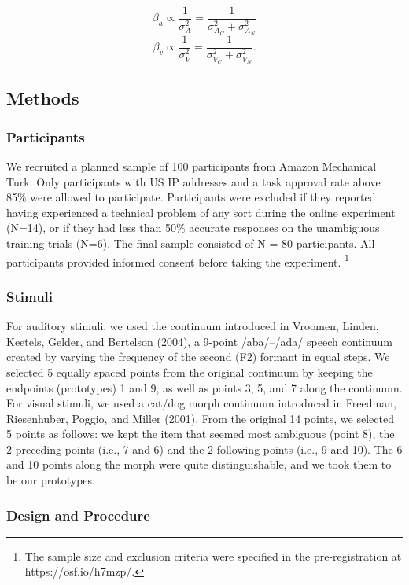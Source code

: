 \documentclass[english,,man,floatsintext]{apa6}
\let\rmarkdownfootnote\footnote%
\def\footnote{\protect\rmarkdownfootnote}
\theoremstyle{definition}
\theoremstyle{definition}
\theoremstyle{definition}
\theoremstyle{remark}
\begin{document}
\[\beta_a \propto \frac{1}{\sigma^2_{A}} = \frac{1}{\sigma^2_{A_C} + \sigma^2_{A_N}}\]
\[\beta_v \propto \frac{1}{\sigma^2_{V}} = \frac{1}{\sigma^2_{V_C} + \sigma^2_{V_N}}.\]

\subsection{Methods}\label{methods}

\subsubsection{Participants}\label{participants}

We recruited a planned sample of 100 participants from Amazon Mechanical
Turk. Only participants with US IP addresses and a task approval rate
above 85\% were allowed to participate. Participants were excluded if
they reported having experienced a technical problem of any sort during
the online experiment (N=14), or if they had less than 50\% accurate
responses on the unambiguous training trials (N=6). The final sample
consisted of N = 80 participants. All participants provided informed
consent before taking the experiment.
\footnote{The sample size and exclusion criteria were specified in the pre-registration at https://osf.io/h7mzp/.}

\subsubsection{Stimuli}\label{stimuli}

For auditory stimuli, we used the continuum introduced in Vroomen,
Linden, Keetels, Gelder, and Bertelson (2004), a 9-point /aba/--/ada/
speech continuum created by varying the frequency of the second (F2)
formant in equal steps. We selected 5 equally spaced points from the
original continuum by keeping the endpoints (prototypes) 1 and 9, as
well as points 3, 5, and 7 along the continuum. For visual stimuli, we
used a cat/dog morph continuum introduced in Freedman, Riesenhuber,
Poggio, and Miller (2001). From the original 14 points, we selected 5
points as follows: we kept the item that seemed most ambiguous (point
8), the 2 preceding points (i.e., 7 and 6) and the 2 following points
(i.e., 9 and 10). The 6 and 10 points along the morph were quite
distinguishable, and we took them to be our prototypes.

\subsubsection{Design and Procedure}\label{design-and-procedure}
\end{document}
